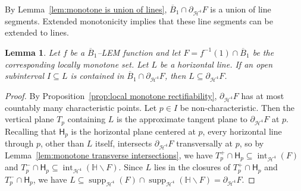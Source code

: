 \documentclass[11pt,reqno]{amsart}
\renewcommand{\H}{\mathbb{H}}
\newcommand{\cH}{\mathcal{H}}
\renewcommand{\epsilon}{\varepsilon}
\newcommand{\0}{\mathbf{0}}
\renewcommand{\1}{\mathbf 1}
\renewcommand{\subset}{\subseteq}
\renewcommand{\setminus}{\smallsetminus}
\newtheorem{lemma}[thm]{Lemma}
\theoremstyle{remark}
\DeclareMathOperator{\inter}{int}
\DeclareMathOperator{\supp}{supp}
\begin{document}


By Lemma~\ref{lem:monotone is union of lines}, $\overline{B}_1\cap \partial_{\cH^4} F$ is a union of line segments.  Extended monotonicity implies that these line segments can be extended to lines.

\begin{lemma}\label{lem:extended monotone lines}
  Let $f$ be a $\overline{B}_1$--LEM function and let $F=f^{-1}(1)\cap \overline{B}_1$ be the corresponding locally monotone set.  Let $L$ be a horizontal line.  If an open subinterval $I\subset L$ is contained in $\overline{B}_1 \cap \partial_{\cH^4} F$, then $L\subset \partial_{\cH^4} F$.
\end{lemma}
\begin{proof}
  By Proposition~\ref{prop:local monotone rectifiability}, $\partial_{\cH^4} F$ has  at most countably many characteristic points.  Let $p\in I$ be non-characteristic.  Then the vertical plane $T_p$ containing $L$ is the approximate tangent plane to $\partial_{\cH^4} F$ at $p$.  Recalling that $\mathsf{H}_p$ is the horizontal plane centered at $p$, every horizontal line through $p$, other than $L$ itself, intersects $\partial_{\cH^4} F$ transversally at $p$, so by Lemma~\ref{lem:monotone transverse intersections}, we have $T_p^+\cap \mathsf{H}_p\subset\inter_{\cH^4} (F)$ and $T_p^-\cap \mathsf{H}_p\subset\inter_{\cH^4} (\H\setminus F)$.  Since $L$ lies in the closures of $T_p^+\cap \mathsf{H}_p$ and $T_p^-\cap \mathsf{H}_p$, we have $L\subset \supp_{\cH^4} (F)\cap \supp_{\cH^4} (\H\setminus F)=\partial_{\cH^4} F$.
\end{proof}
\end{document}
